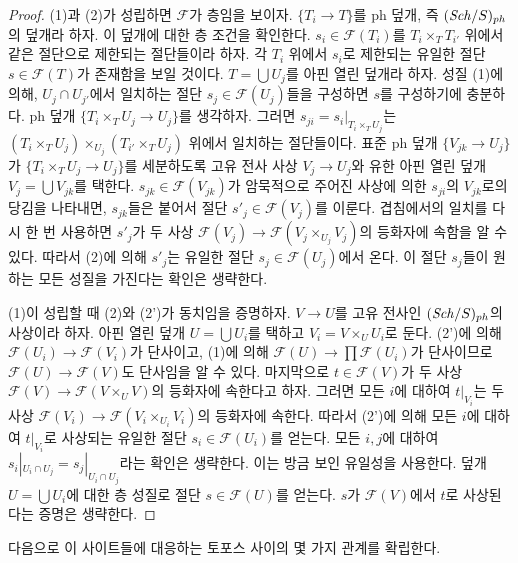 \begin{proof}
(1)과 (2)가 성립하면 $\mathcal{F}$가 층임을 보이자.
$\{T_i \to T\}$를 ph 덮개, 즉 $(\mathit{Sch}/S)_{ph}$의 덮개라 하자. 이 덮개에
대한 층 조건을 확인한다. $s_i \in \mathcal{F}(T_i)$를
$T_i \times_T T_{i'}$ 위에서 같은 절단으로 제한되는 절단들이라 하자.
각 $T_i$ 위에서 $s_i$로 제한되는 유일한 절단
$s \in \mathcal{F}(T)$가 존재함을 보일 것이다. $T = \bigcup U_j$를
아핀 열린 덮개라 하자. 성질 (1)에 의해, $U_j \cap U_{j'}$에서
일치하는 절단 $s_j \in \mathcal{F}(U_j)$들을 구성하면 $s$를 구성하기에
충분하다. ph 덮개 $\{T_i \times_T U_j \to U_j\}$를 생각하자. 그러면
$s_{ji} = s_i|_{T_i \times_T U_j}$는
$(T_i \times_T U_j) \times_{U_j} (T_{i'} \times_T U_j)$ 위에서 일치하는
절단들이다. 표준 ph 덮개 $\{V_{jk} \to U_j\}$가
$\{T_i \times_T U_j \to U_j\}$를 세분하도록 고유 전사 사상
$V_j \to U_j$와 유한 아핀 열린 덮개 $V_j = \bigcup V_{jk}$를 택한다.
$s_{jk} \in \mathcal{F}(V_{jk})$가 암묵적으로 주어진 사상에 의한
$s_{ji}$의 $V_{jk}$로의 당김을 나타내면, $s_{jk}$들은 붙어서 절단
$s'_j \in \mathcal{F}(V_j)$를 이룬다. 겹침에서의 일치를 다시 한 번
사용하면 $s'_j$가 두 사상
$\mathcal{F}(V_j) \to \mathcal{F}(V_j \times_{U_j} V_j)$의 등화자에
속함을 알 수 있다. 따라서 (2)에 의해 $s'_j$는 유일한 절단
$s_j \in \mathcal{F}(U_j)$에서 온다. 이 절단 $s_j$들이 원하는 모든
성질을 가진다는 확인은 생략한다.

\medskip\noindent
(1)이 성립할 때 (2)와 (2')가 동치임을 증명하자.
$V \to U$를 고유 전사인 $(\mathit{Sch}/S)_{ph}$의 사상이라 하자. 아핀 열린
덮개 $U = \bigcup U_i$를 택하고 $V_i = V \times_U U_i$로 둔다. (2')에
의해 $\mathcal{F}(U_i) \to \mathcal{F}(V_i)$가 단사이고, (1)에 의해
$\mathcal{F}(U) \to \prod \mathcal{F}(U_i)$가 단사이므로
$\mathcal{F}(U) \to \mathcal{F}(V)$도 단사임을 알 수 있다. 마지막으로
$t \in \mathcal{F}(V)$가 두 사상
$\mathcal{F}(V) \to \mathcal{F}(V \times_U V)$의 등화자에 속한다고
하자. 그러면 모든 $i$에 대하여 $t|_{V_i}$는 두 사상
$\mathcal{F}(V_i) \to \mathcal{F}(V_i \times_{U_i} V_i)$의 등화자에
속한다. 따라서 (2')에 의해 모든 $i$에 대하여 $t|_{V_i}$로 사상되는
유일한 절단 $s_i \in \mathcal{F}(U_i)$를 얻는다. 모든 $i, j$에 대하여
$s_i|_{U_i \cap U_j} = s_j|_{U_i \cap U_j}$라는 확인은 생략한다. 이는
방금 보인 유일성을 사용한다. 덮개 $U = \bigcup U_i$에 대한 층 성질로
절단 $s \in \mathcal{F}(U)$를 얻는다. $s$가 $\mathcal{F}(V)$에서 $t$로
사상된다는 증명은 생략한다.
\end{proof}

\noindent
다음으로 이 사이트들에 대응하는 토포스 사이의 몇 가지 관계를
확립한다.


